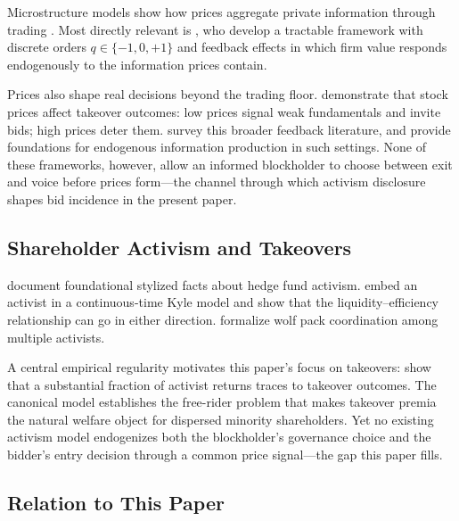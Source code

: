 Microstructure models show how prices aggregate private information through trading \citep{Kyle1985,GlostenMilgrom1985}. Most directly relevant is \citet{EdmansGoldsteinJiang2015}, who develop a tractable framework with discrete orders $q \in \{-1,0,+1\}$ and feedback effects in which firm value responds endogenously to the information prices contain.

Prices also shape real decisions beyond the trading floor. \citet{EdmansGoldsteinJiang2012} demonstrate that stock prices affect takeover outcomes: low prices signal weak fundamentals and invite bids; high prices deter them. \citet{BondEdmansGoldstein2012} survey this broader feedback literature, and \citet{DowGoldsteinGuembel2017} provide foundations for endogenous information production in such settings. None of these frameworks, however, allow an informed blockholder to choose between exit and voice before prices form---the channel through which activism disclosure shapes bid incidence in the present paper.

\subsection{Shareholder Activism and Takeovers}

\citet{BravJiangPartnoyThomas2008} document foundational stylized facts about hedge fund activism. \citet{BackEtAl2018} embed an activist in a continuous-time Kyle model and show that the liquidity--efficiency relationship can go in either direction. \citet{BravDasguptaMathews2022} formalize wolf pack coordination among multiple activists.

A central empirical regularity motivates this paper's focus on takeovers: \citet{GreenwoodSchor2009} show that a substantial fraction of activist returns traces to takeover outcomes. The canonical \citet{GrossmanHart1980} model establishes the free-rider problem that makes takeover premia the natural welfare object for dispersed minority shareholders. Yet no existing activism model endogenizes both the blockholder's governance choice and the bidder's entry decision through a common price signal---the gap this paper fills.

\subsection{Relation to This Paper}

